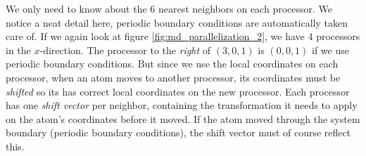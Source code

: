 We only need to know about the 6 nearest neighbors on each processor. We notice a neat detail here, periodic boundary conditions are automatically taken care of. If we again look at figure \ref{fig:md_parallelization_2}, we have 4 processors in the $x$-direction. The processor to the \textit{right} of $(3,0,1)$ is $(0,0,1)$ if we use periodic boundary conditions. But since we use the local coordinates on each processor, when an atom moves to another processor, its coordinates must be \textit{shifted} so its has correct local coordinates on the new processor. Each processor has one \textit{shift vector} per neighbor, containing the transformation it needs to apply on the atom's coordinates before it moved. If the atom moved through the system boundary (periodic boundary conditions), the shift vector must of course reflect this. 

